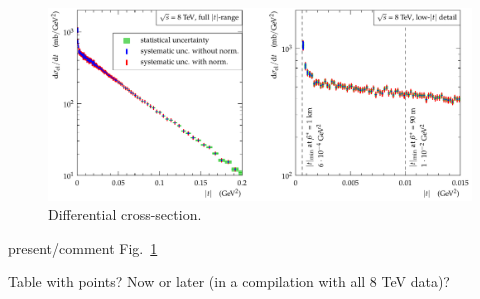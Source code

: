 \begin{figure}
\begin{center}
\includegraphics[width=16cm]{fig/plotTabulation.pdf}
\vskip-3mm
\caption{Differential cross-section.}
\label{fig:dsdt}
\end{center}
\end{figure}

\> present/comment Fig.~\ref{fig:dsdt}

\> Table with points? Now or later (in a compilation with all 8 TeV data)?

